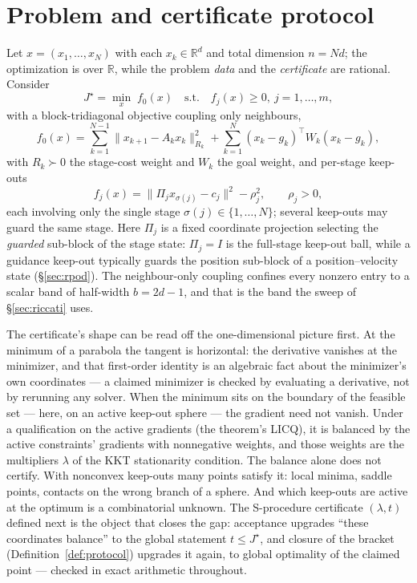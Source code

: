\documentclass[11pt]{article}
\theoremstyle{definition}
\theoremstyle{remark}
\newcommand{\R}{\mathbb{R}}
\renewcommand{\_}{\ifdim\fontdimen3\font=0pt\relax\char`\_\else\textunderscore\fi\hspace{0pt}}
\begin{document}
\section{Problem and certificate protocol}\label{sec:setup}
Let $x=(x_1,\dots,x_N)$ with each $x_k\in\R^d$ and total dimension $n=Nd$; the
optimization is over $\R$, while the problem \emph{data} and the
\emph{certificate} are rational. Consider
\begin{equation}\label{eq:qcqp}
J^\star=\min_x\; f_0(x)\quad\text{s.t.}\quad f_j(x)\ge 0,\ j=1,\dots,m,
\end{equation}
with a block-tridiagonal objective coupling only neighbours,
\[
f_0(x)=\sum_{k=1}^{N-1} \lVert x_{k+1}-A_k x_k\rVert_{R_k}^2
       +\sum_{k=1}^{N} (x_k-g_k)^\top W_k (x_k-g_k),
\]
with $R_k\succ0$ the stage-cost weight and $W_k$ the goal weight, and per-stage
keep-outs
\begin{equation}\label{eq:keepout}
f_j(x)=\lVert \Pi_j x_{\sigma(j)}-c_j\rVert^2-\rho_j^2,\qquad \rho_j>0,
\end{equation}
each involving only the single stage $\sigma(j)\in\{1,\dots,N\}$; several
keep-outs may guard the same stage. Here $\Pi_j$ is a fixed coordinate
projection selecting the \emph{guarded} sub-block of the stage state:
$\Pi_j=I$ is the full-stage keep-out ball, while a guidance keep-out typically
guards the position sub-block of a position--velocity state (\S\ref{sec:rpod}).
The neighbour-only coupling confines every nonzero entry to a scalar band of
half-width $b=2d-1$, and that is the band the sweep of \S\ref{sec:riccati}
uses.

The certificate's shape can be read off the one-dimensional picture first.
At the minimum of a parabola the tangent is horizontal: the derivative
vanishes at the minimizer, and that first-order identity is an algebraic
fact about the minimizer's own coordinates --- a claimed minimizer is
checked by evaluating a derivative, not by rerunning any solver.
When the minimum sits on the boundary of the feasible set ---
here, on an active keep-out sphere --- the gradient need not vanish.
Under a qualification on the active gradients (the theorem's LICQ), it is
balanced by the active constraints' gradients with nonnegative weights, and
those weights are the multipliers $\lambda$ of the KKT stationarity
condition. The balance alone does not certify. With nonconvex keep-outs
many points satisfy it: local minima, saddle points, contacts on the wrong
branch of a sphere. And which keep-outs are active at the optimum is a
combinatorial unknown. The S-procedure certificate $(\lambda,t)$ defined
next is the object that closes the gap: acceptance upgrades ``these
coordinates balance'' to the global statement $t\le J^\star$, and closure
of the bracket (Definition~\ref{def:protocol}) upgrades it again, to global
optimality of the claimed point --- checked in exact arithmetic throughout.
\end{document}
